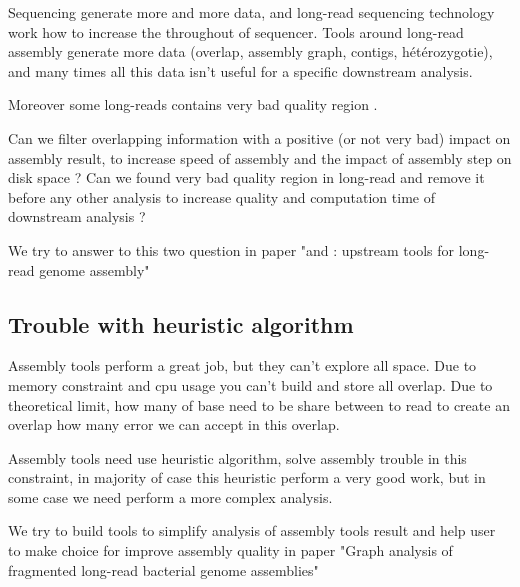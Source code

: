 \documentclass[./main.tex]{subfiles}
\begin{document}
Sequencing generate more and more data, and long-read sequencing technology work how to increase the throughout of sequencer. Tools around long-read assembly generate more data (overlap, assembly graph, contigs, hétérozygotie), and many times all this data isn't useful for a specific downstream analysis.

Moreover some long-reads contains very bad quality region \cite{blog_post_error_repartition}.

Can we filter overlapping information with a positive (or not very bad) impact on assembly result, to increase speed of assembly and the impact of assembly step on disk space ?
Can we found very bad quality region in long-read and remove it before any other analysis to increase quality and computation time of downstream analysis ?

We try to answer to this two question in paper "\yacrd and \fpa: upstream tools for long-read genome assembly"

\subsection{Trouble with heuristic algorithm}

Assembly tools perform a great job, but they can't explore all space.
Due to memory constraint and cpu usage you can't build and store all overlap.
Due to theoretical limit, how many of base need to be share between to read to create an overlap how many error we can accept in this overlap.

Assembly tools need use heuristic algorithm, solve assembly trouble in this constraint, in majority of case this heuristic perform a very good work, but in some case we need perform a more complex analysis.

We try to build tools to simplify analysis of assembly tools result and help user to make choice for improve assembly quality in paper "Graph analysis of fragmented long-read bacterial genome assemblies"

\end{document}
